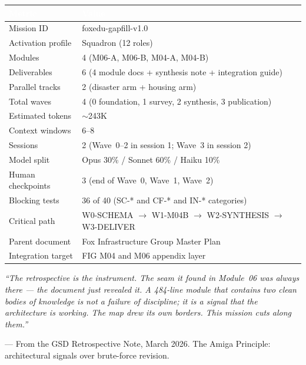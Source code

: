 \documentclass[11pt,letterpaper]{article}
\newcommand{\tableheader}[1]{\textbf{\sffamily\textcolor{white}{#1}}}
\begin{document}
\begin{center}
\begin{tabularx}{\textwidth}{L{4cm}X}
\toprule
{}
\tableheader{Metric} & \tableheader{Value} \\
\midrule
Mission ID & foxedu-gapfill-v1.0 \\
Activation profile & Squadron (12 roles) \\
Modules & 4 (M06-A, M06-B, M04-A, M04-B) \\
Deliverables & 6 (4 module docs + synthesis note + integration guide) \\
Parallel tracks & 2 (disaster arm + housing arm) \\
Total waves & 4 (0 foundation, 1 survey, 2 synthesis, 3 publication) \\
Estimated tokens & $\sim$243K \\
Context windows & 6--8 \\
Sessions & 2 (Wave~0--2 in session 1; Wave~3 in session 2) \\
Model split & Opus 30\% / Sonnet 60\% / Haiku 10\% \\
Human checkpoints & 3 (end of Wave~0, Wave~1, Wave~2) \\
Blocking tests & 36 of 40 (SC-* and CF-* and IN-* categories) \\
Critical path & W0-SCHEMA $\rightarrow$ W1-M04B $\rightarrow$ W2-SYNTHESIS $\rightarrow$ W3-DELIVER \\
Parent document & Fox Infrastructure Group Master Plan \\
Integration target & FIG M04 and M06 appendix layer \\
\bottomrule
\end{tabularx}
\end{center}

\vspace{2em}

\begin{quotebox}
\textit{``The retrospective is the instrument. The seam it found in Module~06 was always there --- the document just revealed it. A 484-line module that contains two clean bodies of knowledge is not a failure of discipline; it is a signal that the architecture is working. The map drew its own borders. This mission cuts along them.''}

\vspace{0.8em}
{\small\sffamily\textcolor{subtlegray}{--- From the GSD Retrospective Note, March 2026. The Amiga Principle: architectural signals over brute-force revision.}}
\end{quotebox}
\end{document}
